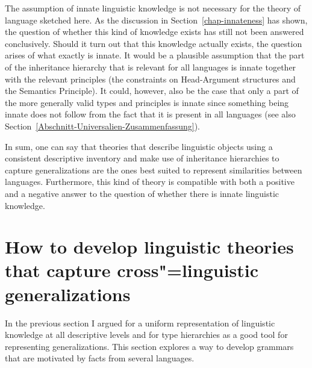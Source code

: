 The assumption of innate linguistic knowledge is not necessary for the theory of language sketched
here. As the discussion in Section~\ref{chap-innateness} has shown, the question of whether this kind of knowledge
exists has still not been answered conclusively. Should it turn out that this knowledge actually exists, the question arises of what exactly is innate. It would be a plausible assumption
that the part of the inheritance hierarchy that is relevant for all languages is innate together
with the relevant principles (\eg the constraints on Head-Argument structures and the Semantics Principle). It could, however, also be the case that only a part of the more generally
valid types and principles is innate since something being innate does not follow from the fact that
it is present in all languages (see also Section~\ref{Abschnitt-Universalien-Zusammenfassung}).

In sum, one can say that theories that describe linguistic objects using a consistent descriptive inventory and make use of inheritance hierarchies to capture
generalizations are the ones best suited to represent similarities between languages. Furthermore,
this kind of theory is compatible with both a positive and a negative
answer to the question of whether there is innate linguistic knowledge.

\section{How to develop linguistic theories that capture cross"=linguistic generalizations}
\label{sec-develop-theories-coregram}

In the previous section I argued for a uniform representation of linguistic knowledge at all
descriptive levels and for type hierarchies as a good tool for representing generalizations. This
section explores a way to develop grammars that are motivated by facts from several languages.

